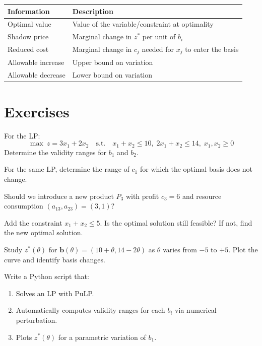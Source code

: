 \begin{center}
\renewcommand{\arraystretch}{1.2}
\begin{tabular}{lp{8cm}}
  \toprule
  \textbf{Information} & \textbf{Description} \\
  \midrule
  Optimal value & Value of the variable/constraint at optimality \\
  Shadow price & Marginal change in $z^*$ per unit of $b_i$ \\
  Reduced cost & Marginal change in $c_j$ needed for $x_j$ to enter
                  the basis \\
  Allowable increase & Upper bound on variation \\
  Allowable decrease & Lower bound on variation \\
  \bottomrule
\end{tabular}
\end{center}

\section{Exercises}

\begin{exercise}
For the LP:
\[
\max\ z = 3x_1 + 2x_2 \quad \text{s.t.} \quad
x_1 + x_2 \le 10,\; 2x_1 + x_2 \le 14,\; x_1, x_2 \ge 0
\]
Determine the validity ranges for $b_1$ and $b_2$.
\end{exercise}

\begin{exercise}
For the same LP, determine the range of $c_1$ for which the optimal basis
does not change.
\end{exercise}

\begin{exercise}
Should we introduce a new product $P_3$ with profit $c_3 = 6$ and resource
consumption $(a_{13}, a_{23}) = (3, 1)$?
\end{exercise}

\begin{exercise}
Add the constraint $x_1 + x_2 \le 5$.  Is the optimal solution still
feasible?  If not, find the new optimal solution.
\end{exercise}

\begin{exercise}
Study $z^*(\theta)$ for $\mathbf{b}(\theta) = (10 + \theta, 14 - 2\theta)$
as $\theta$ varies from $-5$ to $+5$.  Plot the curve and identify basis
changes.
\end{exercise}

\begin{exercise}
Write a Python script that:
\begin{enumerate}
  \item Solves an LP with PuLP.
  \item Automatically computes validity ranges for each $b_i$ via numerical
        perturbation.
  \item Plots $z^*(\theta)$ for a parametric variation of $b_1$.
\end{enumerate}
\end{exercise}
